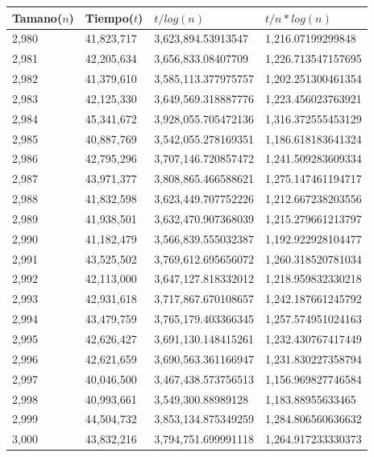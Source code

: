 \begin{table}[H]
\parbox{0.3\textwidth}{
    \begin{tabular}{ | l | l | l | l |}
    \hline
Tamano($n$) & Tiempo($t$) & $t / log(n)$ & $t / n*log(n)$ \\ \hline
2,980 & 41,823,717 & 3,623,894.53913547 & 1,216.07199299848 \\ \hline
2,981 & 42,205,634 & 3,656,833.08407709 & 1,226.713547157695 \\ \hline
2,982 & 41,379,610 & 3,585,113.377975757 & 1,202.251300461354 \\ \hline
2,983 & 42,125,330 & 3,649,569.318887776 & 1,223.456023763921 \\ \hline
2,984 & 45,341,672 & 3,928,055.705472136 & 1,316.372555453129 \\ \hline
2,985 & 40,887,769 & 3,542,055.278169351 & 1,186.618183641324 \\ \hline
2,986 & 42,795,296 & 3,707,146.720857472 & 1,241.509283609334 \\ \hline
2,987 & 43,971,377 & 3,808,865.466588621 & 1,275.147461194717 \\ \hline
2,988 & 41,832,598 & 3,623,449.707752226 & 1,212.667238203556 \\ \hline
2,989 & 41,938,501 & 3,632,470.907368039 & 1,215.279661213797 \\ \hline
2,990 & 41,182,479 & 3,566,839.555032387 & 1,192.922928104477 \\ \hline
2,991 & 43,525,502 & 3,769,612.695656072 & 1,260.318520781034 \\ \hline
2,992 & 42,113,000 & 3,647,127.818332012 & 1,218.959832330218 \\ \hline
2,993 & 42,931,618 & 3,717,867.670108657 & 1,242.187661245792 \\ \hline
2,994 & 43,479,759 & 3,765,179.403366345 & 1,257.574951024163 \\ \hline
2,995 & 42,626,427 & 3,691,130.148415261 & 1,232.430767417449 \\ \hline
2,996 & 42,621,659 & 3,690,563.361166947 & 1,231.830227358794 \\ \hline
2,997 & 40,046,500 & 3,467,438.573756513 & 1,156.969827746584 \\ \hline
2,998 & 40,993,661 & 3,549,300.88989128 & 1,183.88955633465 \\ \hline
2,999 & 44,504,732 & 3,853,134.875349259 & 1,284.806560636632 \\ \hline
3,000 & 43,832,216 & 3,794,751.699991118 & 1,264.917233330373 \\ \hline
    \end{tabular}
}
\end{table}

